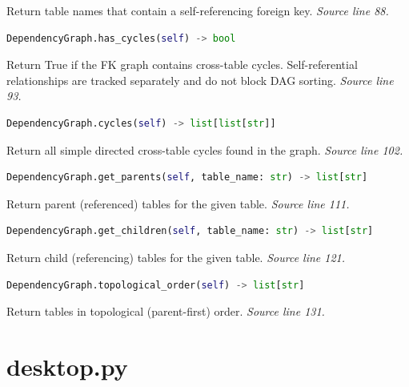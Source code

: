 {\small Return table names that contain a self-referencing foreign key. \textit{Source line 88.}}



\begin{lstlisting}[language=Python]
DependencyGraph.has_cycles(self) -> bool
\end{lstlisting}


{\small Return True if the FK graph contains cross-table cycles. Self-referential relationships are tracked separately and do not block DAG sorting. \textit{Source line 93.}}



\begin{lstlisting}[language=Python]
DependencyGraph.cycles(self) -> list[list[str]]
\end{lstlisting}


{\small Return all simple directed cross-table cycles found in the graph. \textit{Source line 102.}}



\begin{lstlisting}[language=Python]
DependencyGraph.get_parents(self, table_name: str) -> list[str]
\end{lstlisting}


{\small Return parent (referenced) tables for the given table. \textit{Source line 111.}}



\begin{lstlisting}[language=Python]
DependencyGraph.get_children(self, table_name: str) -> list[str]
\end{lstlisting}


{\small Return child (referencing) tables for the given table. \textit{Source line 121.}}



\begin{lstlisting}[language=Python]
DependencyGraph.topological_order(self) -> list[str]
\end{lstlisting}


{\small Return tables in topological (parent-first) order. \textit{Source line 131.}}

\section{desktop.py}


